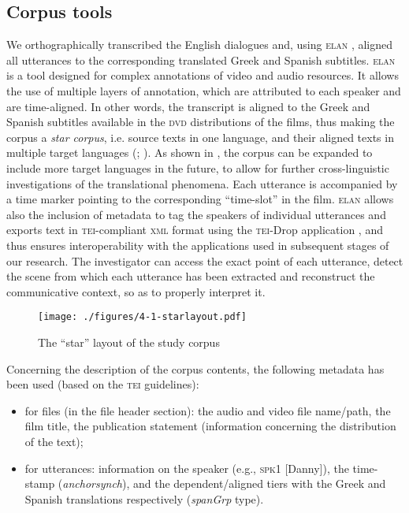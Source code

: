\documentclass[output=paper]{LSP/langsci}
\begin{document}
\subsection{Corpus tools} \label{sec:2:3:2}

We orthographically transcribed the English dialogues and, using \textsc{elan} \citep{Brugman2004}, aligned all utterances to the corresponding translated Greek and Spanish subtitles. \textsc{elan} is a tool designed for complex annotations of video and audio resources. It allows the use of multiple layers of annotation, which are attributed to each speaker and are time-aligned. In other words, the transcript is aligned to the Greek and Spanish subtitles available in the \textsc{dvd} distributions of the films, thus making the corpus a \textit{star corpus}, i.e. source texts in one language, and their aligned texts in multiple target languages (\citealt[140--141]{Johansson2003}; \citealt[260]{Saridakis2010}). As shown in , the corpus can be expanded to include more target languages in the future, to allow for further cross-linguistic investigations of the translational phenomena. Each utterance is accompanied by a time marker pointing to the corresponding “time-slot” in the film. \textsc{elan} allows also the inclusion of metadata to tag the speakers of individual utterances and exports text in \textsc{tei}-compliant \textsc{xml} format using the \textsc{tei}-\textsc{D}rop application \citep{Schmidt2011}, and thus ensures interoperability with the applications used in subsequent stages of our research. The investigator can access the exact point of each utterance, detect the scene from which each utterance has been extracted and reconstruct the communicative context, so as to properly interpret it.

\begin{figure}
\texttt{[image: ./figures/4-1-starlayout.pdf]}
\caption{The “star” layout of the study corpus} \label{fig:2:1}
\end{figure}

Concerning the description of the corpus contents, the following metadata has been used (based on the \textsc{tei} guidelines):

\begin{itemize}
\item for files (in the file header section): the audio and video file name/path, the film title, the publication statement (information concerning the distribution of the text);
\item for utterances: information on the speaker (e.g., \textsc{spk1} [Danny]), the time-stamp (\textit{anchorsynch}), and the dependent/aligned tiers with the Greek and Spanish translations respectively (\textit{spanGrp} type).
\end{itemize}
\end{document}

